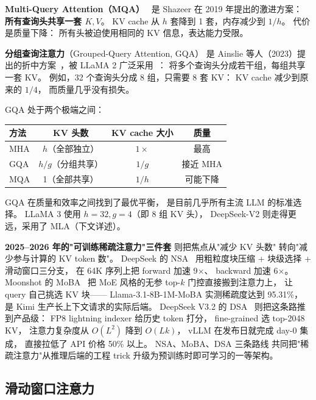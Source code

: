 \textbf{Multi-Query Attention（MQA）}~\cite{shazeer2019mqa}
是 Shazeer 在 2019 年提出的激进方案：
\textbf{所有查询头共享一套 $K, V$}。
KV cache 从 $h$ 套降到 1 套，内存减少到 $1/h$。
代价是质量下降：
所有头被迫使用相同的 KV 信息，表达能力受限。

\textbf{分组查询注意力}（Grouped-Query Attention, GQA）
是 Ainslie 等人（2023）提出的折中方案~\cite{ainslie2023gqa}，被 LLaMA 2 广泛采用~\cite{dubey2024llama3}：
将多个查询头分成若干组，每组共享一套 KV。
例如，32 个查询头分成 8 组，只需要 8 套 KV：
KV cache 减少到原来的 $1/4$，
而质量几乎没有损失。

GQA 处于两个极端之间：

\begin{center}\small
\renewcommand{\arraystretch}{1.3}
\begin{tabular}{lccc}
\toprule
\rowcolor{figLightGray}
\textbf{方法} & \textbf{KV 头数} & \textbf{KV cache 大小} & \textbf{质量} \\
\midrule
MHA  & $h$（全部独立） & $1\times$ & 最高 \\
GQA  & $h/g$（分组共享） & $1/g$ & 接近 MHA \\
MQA  & 1（全部共享） & $1/h$ & 可能下降 \\
\bottomrule
\end{tabular}
\end{center}

GQA 在质量和效率之间找到了最优平衡，
是目前几乎所有主流 LLM 的标准选择。
LLaMA 3 使用 $h = 32, g = 4$（即 8 组 KV 头），
DeepSeek-V2 则走得更远，采用了 MLA（下文详述）。

\textbf{2025--2026 年的"可训练稀疏注意力"三件套}
则把焦点从"减少 KV 头数"
转向"减少参与计算的 KV token 数"。
DeepSeek 的 NSA~\cite{yuan2025nsa}
用粗粒度块压缩 + 块级选择 + 滑动窗口三分支，
在 64K 序列上把 forward 加速 9$\times$、
backward 加速 6$\times$。
Moonshot 的 MoBA~\cite{moba2025}
把 MoE 风格的无参 top-$k$ 门控直接搬到注意力上，
让 query 自己挑选 KV 块——
Llama-3.1-8B-1M-MoBA 实测稀疏度达到 95.31\%，
是 Kimi 生产长上下文请求的实际后端。
DeepSeek V3.2 的 DSA~\cite{dsa2025}
则把这条路推到产品级：
FP8 lightning indexer 给历史 token 打分，
fine-grained 选 top-2048 KV，
注意力复杂度从 $O(L^2)$ 降到 $O(Lk)$，
vLLM 在发布日就完成 day-0 集成，
直接拉低了 API 价格 50\% 以上。
NSA、MoBA、DSA 三条路线
共同把"稀疏注意力"从推理后端的工程 trick
升级为预训练时即可学习的一等架构。

\subsection{滑动窗口注意力}

